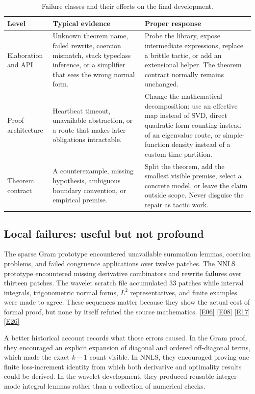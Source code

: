 \documentclass[11pt,a4paper]{article}
\newcommand{\ev}[1]{%
  \hyperref[ev:#1]{\textcolor{ReportBlue}{\textsf{\scriptsize[#1]}}}}
\begin{document}
\begin{table}[htbp]
\centering
\caption{Failure classes and their effects on the final development.}
\label{tab:failure-classes}
\begin{tabularx}{\linewidth}{@{}L{30mm}L{48mm}Y@{}}
\toprule
\textbf{Level} & \textbf{Typical evidence} & \textbf{Proper response} \\
\midrule
Elaboration and API &
Unknown theorem name, failed rewrite, coercion mismatch, stuck typeclass inference,
or a simplifier that sees the wrong normal form. &
Probe the library, expose intermediate expressions, replace a brittle tactic, or add
an extensional helper. The theorem contract normally remains unchanged. \\
Proof architecture &
Heartbeat timeout, unavailable abstraction, or a route that makes later obligations
intractable. &
Change the mathematical decomposition: use an effective map instead of SVD, direct
quadratic-form counting instead of an eigenvalue route, or simple-function density
instead of a custom time partition. \\
Theorem contract &
A counterexample, missing hypothesis, ambiguous boundary convention, or empirical
premise. &
Split the theorem, add the smallest visible premise, select a concrete model, or
leave the claim outside scope. Never disguise the repair as tactic work. \\
\bottomrule
\end{tabularx}
\end{table}

\subsection{Local failures: useful but not profound}

The sparse Gram prototype encountered unavailable summation lemmas, coercion
problems, and failed congruence applications over twelve patches. The NNLS prototype
encountered missing derivative combinators and rewrite failures over thirteen
patches. The wavelet scratch file accumulated 33 patches while interval integrals,
trigonometric normal forms, \(L^2\) representatives, and finite examples were made to
agree. These sequences matter because they show the actual cost of formal proof, but
none by itself refuted the source mathematics. \ev{E06}\ev{E08}\ev{E17}\ev{E26}

A better historical account records what those errors caused. In the Gram proof,
they encouraged an explicit expansion of diagonal and ordered off-diagonal terms,
which made the exact \(k-1\) count visible. In NNLS, they encouraged proving one
finite loss-increment identity from which both derivative and optimality results
could be derived. In the wavelet development, they produced reusable integer-mode
integral lemmas rather than a collection of numerical checks.
\end{document}
